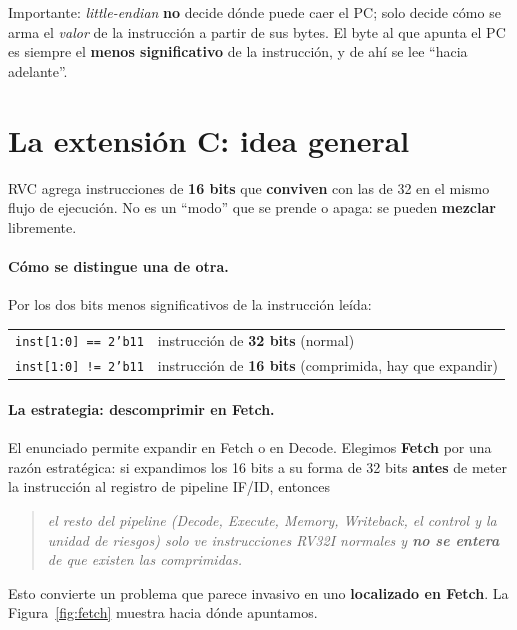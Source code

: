 \documentclass[11pt]{article}
\newcommand{\code}[1]{\texttt{#1}}
\begin{document}
\noindent
Importante: \emph{little-endian} \textbf{no} decide dónde puede caer el PC; solo
decide cómo se arma el \emph{valor} de la instrucción a partir de sus bytes. El
byte al que apunta el PC es siempre el \textbf{menos significativo} de la
instrucción, y de ahí se lee ``hacia adelante''.

\section{La extensión C: idea general}

RVC agrega instrucciones de \textbf{16 bits} que \textbf{conviven} con las de 32
en el mismo flujo de ejecución. No es un ``modo'' que se prende o apaga: se
pueden \textbf{mezclar} libremente.

\paragraph{Cómo se distingue una de otra.} Por los dos bits menos significativos
de la instrucción leída:
\begin{center}
\begin{tabular}{@{}ll@{}}
\toprule
\code{inst[1:0] == 2'b11} & instrucción de \textbf{32 bits} (normal) \\
\code{inst[1:0] != 2'b11} & instrucción de \textbf{16 bits} (comprimida, hay que expandir) \\
\bottomrule
\end{tabular}
\end{center}

\paragraph{La estrategia: descomprimir en Fetch.} El enunciado permite expandir
en Fetch o en Decode. Elegimos \textbf{Fetch} por una razón estratégica: si
expandimos los 16 bits a su forma de 32 bits \textbf{antes} de meter la
instrucción al registro de pipeline IF/ID, entonces

\begin{quote}\itshape
el resto del pipeline (Decode, Execute, Memory, Writeback, el control y la unidad
de riesgos) solo ve instrucciones RV32I normales y \textbf{no se entera} de que
existen las comprimidas.
\end{quote}

Esto convierte un problema que parece invasivo en uno \textbf{localizado en
Fetch}. La Figura~\ref{fig:fetch} muestra hacia dónde apuntamos.
\end{document}
